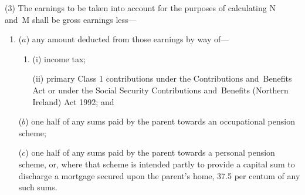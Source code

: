 \documentclass[12pt,a4paper]{article}
\begin{document}
(3) The earnings to be taken into account for the purposes of calculating N and~M shall be gross earnings less—
\begin{enumerate}\item[]
($a$) any amount deducted from those earnings by way of—
\begin{enumerate}\item[]
(i) income tax;

(ii) primary Class 1 contributions under the Contributions and~Benefits Act
or under the Social Security Contributions and~Benefits (Northern Ireland) Act 1992;  %
and
\end{enumerate}

($b$) one half of any sums paid by the parent towards an 
occupational pension scheme;  %

($c$) one half of any sums paid by the parent towards a personal pension scheme, or, where that scheme is intended partly to provide a capital sum to discharge a mortgage secured upon the parent’s home, 37$.$5 per centum of any such sums.
\end{enumerate}
\end{document}
